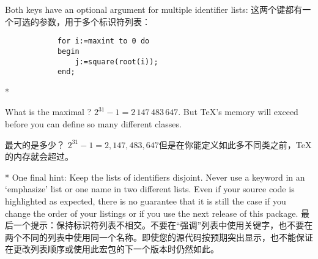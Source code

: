 \begin{paracol}{2}
 Both keys have an optional  argument for multiple
 identifier lists:
 \switchcolumn
 这两个键都有一个可选的参数，用于多个标识符列表：
 \begin{lstxsample}
 \end{lstxsample}
 \begin{lstsample}{}{}
            \begin{lstlisting}
            for i:=maxint to 0 do
            begin
                j:=square(root(i));
            end;
            \end{lstlisting}
 \end{lstsample}
 \switchcolumn[0]*%
 \begin{advise}
 \item What is the maximal ?
       \advisespace
       $2^{31}-1=2\,147\,483\,647$. But \TeX's memory will exceed before you
       can define so many different classes.
 \end{advise}
 \switchcolumn
 \begin{advise}
\item 最大的是多少？
\advisespace
$2^{31}-1=2,147,483,647$但是在你能定义如此多不同类之前，\TeX 的内存就会超过。
\end{advise}
 \switchcolumn[0]*%
 One final hint: Keep the lists of identifiers disjoint. Never use a keyword
 in an `emphasize' list or one name in two different lists. Even if your
 source code is highlighted as expected, there is no guarantee that it is
 still the case if you change the order of your listings or if you use the
 next release of this package.
 \switchcolumn
 最后一个提示：保持标识符列表不相交。不要在“强调”列表中使用关键字，也不要在两个不同的列表中使用同一个名称。即使您的源代码按预期突出显示，也不能保证在更改列表顺序或使用此宏包的下一个版本时仍然如此。
\end{paracol}